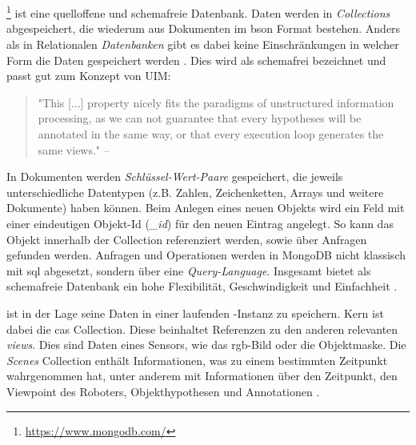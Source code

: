 \section{\mongodb}
\label{sec:mongodb}
\mongodb\footnote{\url{https://www.mongodb.com/}} ist eine quelloffene und schemafreie Datenbank. Daten werden in \textit{Collections} abgespeichert, die wiederum aus Dokumenten im \gls{bson} Format bestehen. Anders als in Relationalen \textit{Datenbanken} gibt es dabei keine Einschränkungen in welcher Form die Daten gespeichert werden \cite{mongoVsOracle}. Dies wird als schemafrei bezeichnet und passt gut zum Konzept von UIM:
\begin{quote}
"This [...] property nicely fits the paradigms of unstructured information processing, as we can not guarantee that every hypotheses will be annotated in the same way, or that every execution loop generates the same views." \hfill -- \cite{episodicMemory}
\end{quote}
In Dokumenten werden \textit{Schlüssel-Wert-Paare} gespeichert, die jeweils unterschiedliche Datentypen (z.B. Zahlen, Zeichenketten, Arrays und weitere Dokumente) haben können. Beim Anlegen eines neuen Objekts wird ein Feld mit einer eindeutigen Objekt-Id (\textit{\_id}) für den neuen Eintrag angelegt. So kann das Objekt innerhalb der Collection referenziert werden, sowie über Anfragen gefunden werden. Anfragen und Operationen werden in MongoDB nicht klassisch mit \gls{sql} abgesetzt, sondern über eine \textit{Query-Language}. Insgesamt bietet \mongodb als schemafreie Datenbank ein hohe Flexibilität, Geschwindigkeit und Einfachheit \cite{mongoVsOracle}.  \par 
\robosherlock ist in der Lage seine Daten in einer laufenden \mongodb-Instanz zu speichern. Kern ist dabei die \gls{cas} Collection. Diese beinhaltet Referenzen zu den anderen relevanten \textit{views}. Dies sind Daten eines Sensors, wie das \gls{rgb}-Bild oder die Objektmaske. Die \textit{Scenes} Collection enthält Informationen, was \robosherlock zu einem bestimmten Zeitpunkt wahrgenommen hat, unter anderem mit Informationen über den Zeitpunkt, den Viewpoint des Roboters, Objekthypothesen und Annotationen \cite{episodicMemory}.  



